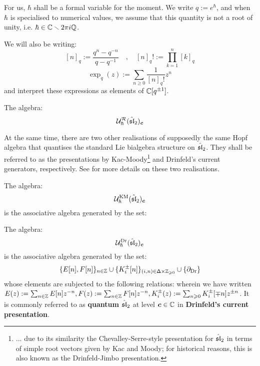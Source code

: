        For us, $\hbar$ shall be a formal variable for the moment. We write $q := e^{\hbar}$, and when $\hbar$ is specialised to numerical values, we assume that this quantity is not a root of unity, i.e. $\hbar \in \bbC \setminus 2\pi i \Q$.

        We will also be writing:
            $$[n]_q := \frac{q^n - q^{-n}}{q - q^{-1}} \quad, \quad [n]_q! := \prod_{k = 1}^n [k]_q$$
            $$\exp_q(z) := \sum_{n \geq 0} \frac{1}{[n]_q!} z^n$$
        and interpret these expressions as elements of $\bbC[q^{\pm 1}]$.
        
        \begin{definition} \label{def: quantum_affine_sl_2_R_matrix_presentation}
            The algebra:
                $$\calU_{\hbar}^{\calR}(\hat{\sl}_2)_{\level}$$
        \end{definition}

        At the same time, there are two other realisations of supposedly the same Hopf algebra that quantises the standard Lie bialgebra structure on $\hat{\sl}_2$. They shall be referred to as the presentations by Kac-Moody\footnote{... due to its similarity the Chevalley-Serre-style presentation for $\hat{\sl}_2$ in terms of simple root vectors given by Kac and Moody; for historical reasons, this is also known as the Drinfeld-Jimbo presentation.} and Drinfeld's current generators, respectively. See \cite[Subsection 2.1]{ding_pakuliak_khoroshkin_factorisation_of_the_R_matrix_of_quantum_affine_sl_2} for more details on these two realisations.
        \begin{definition} \label{def: quantum_affine_sl_2_kac_moody_presentation}
            The algebra:
                $$\calU_{\hbar}^{\KM}(\hat{\sl}_2)_{\level}$$
            is the associative algebra generated by the set:
                $$$$
        \end{definition}
        \begin{definition} \label{def: quantum_affine_sl_2_drinfeld_current_presentation}
            The algebra:
                $$\calU_{\hbar}^{\current}(\hat{\sl}_2)_{\level}$$
            is the associative algebra generated by the set:
                $$\{ E[n], F[n] \}_{n \in \Z} \cup \{ K_i^{\pm}[n] \}_{(i, n) \in \simpleroots \x \Z_{\geq 0}} \cup \{ \del_{\current} \}$$
            whose elements are subjected to the following relations:
            wherein we have written $E(z) := \sum_{n \in \Z} E[n] z^{-n}, F(z) := \sum_{n \in \Z} F[n] z^{-n}, K_i^{\pm}(z) := \sum_{n \geq 0} K_i^{\pm}[\mp n] z^{\pm n}$. It is commonly referred to as \textbf{quantum $\hat{\sl}_2$} at level $\level \in \bbC$ in \textbf{Drinfeld's current presentation}.
        \end{definition}

